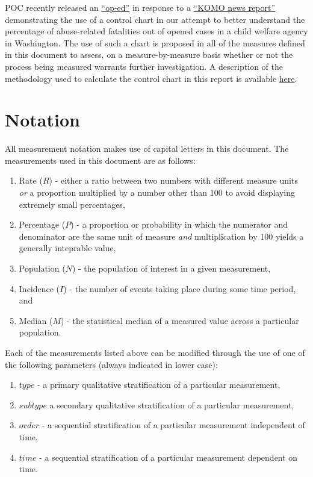 \documentclass[12pt]{article}\usepackage[]{graphicx}\usepackage[]{color}
\begin{document}
POC recently released an \href{http://crosscut.com/2013/12/13/Kidsatrisk/117884/making-progress-protect-children-de-haan/}{``op-ed''} in response to a \href{http://www.komonews.com/news/local/Failure-to-Protect-232727371.html?tab=video&c=y}{``KOMO news report''} demonstrating the use of a control chart in our attempt to better understand the percentage of abuse-related fatalities out of opened cases in a child welfare agency in Washington. The use of such a chart is proposed in all of the measures defined in this document to assess, on a measure-by-measure basis whether or not the process being measured warrants further investigation. A description of the methodology used to calculate the control chart in this report is available \href{http://depts.washington.edu/pocdata/joe/fatalities/fatalities.pdf}{here}.

\section{Notation}

All measurement notation makes use of capital letters in this document. The measurements used in this document are as follows: 

\begin{enumerate}
  \item Rate ($R$) - either a ratio between two numbers with different measure units \emph{or} a proportion multiplied by a number other than 100 to avoid displaying extremely small percentages,
  \item Percentage ($P$) - a proportion or probability in which the numerator and denominator are the same unit of measure \emph{and} multiplication by 100 yields a generally inteprable value,
  \item Population ($N$) - the population of interest in a given measurement,
  \item Incidence ($I$) - the number of events taking place during some time period, and
  \item Median ($M$) - the statistical median of a measured value across a particular population. 
\end{enumerate}

Each of the measurements listed above can be modified through the use of one of the following parameters (always indicated in lower case): 

\begin{enumerate}
  \item $type$ - a primary qualitative stratification of a particular measurement,
  \item $subtype$ a secondary qualitative stratification of a particular measurement,
  \item $order$ - a sequential stratification of a particular measurement independent of time,
  \item $time$ - a sequential stratification of a particular measurement dependent on time.  
\end{enumerate}
\end{document}
